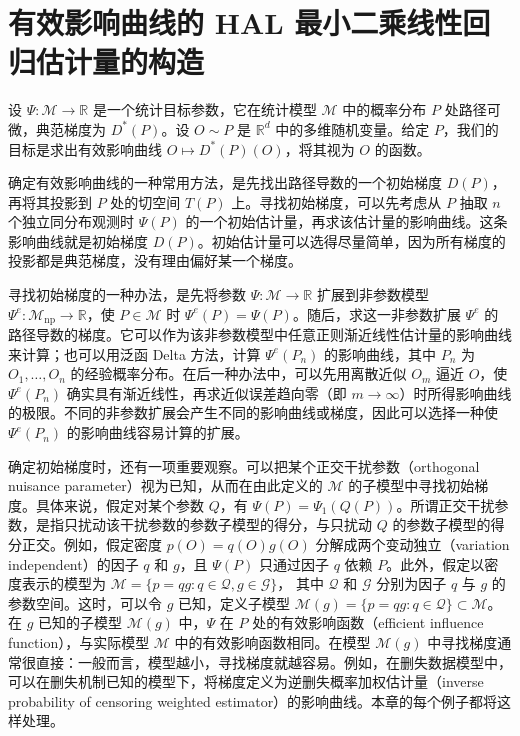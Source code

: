 \section{有效影响曲线的 HAL 最小二乘线性回归估计量的构造}

设 $\Psi:\mathcal M\to\mathbb R$ 是一个统计目标参数，它在统计模型 $\mathcal M$ 中的概率分布 $P$ 处路径可微，典范梯度为 $D^*(P)$。设 $O\sim P$ 是 $\mathbb R^d$ 中的多维随机变量。给定 $P$，我们的目标是求出有效影响曲线 $O\mapsto D^*(P)(O)$，将其视为 $O$ 的函数。

确定有效影响曲线的一种常用方法，是先找出路径导数的一个初始梯度 $D(P)$，再将其投影到 $P$ 处的切空间 $T(P)$ 上。寻找初始梯度，可以先考虑从 $P$ 抽取 $n$ 个独立同分布观测时 $\Psi(P)$ 的一个初始估计量，再求该估计量的影响曲线。这条影响曲线就是初始梯度 $D(P)$。初始估计量可以选得尽量简单，因为所有梯度的投影都是典范梯度，没有理由偏好某一个梯度。

寻找初始梯度的一种办法，是先将参数 $\Psi:\mathcal M\to\mathbb R$ 扩展到非参数模型 $\Psi^e:\mathcal M_{\mathrm{np}}\to\mathbb R$，使 $P\in\mathcal M$ 时 $\Psi^e(P)=\Psi(P)$。随后，求这一非参数扩展 $\Psi^e$ 的路径导数的梯度。它可以作为该非参数模型中任意正则渐近线性估计量的影响曲线来计算；也可以用泛函 Delta 方法，计算 $\Psi^e(P_n)$ 的影响曲线，其中 $P_n$ 为 $O_1,\ldots,O_n$ 的经验概率分布。在后一种办法中，可以先用离散近似 $O_m$ 逼近 $O$，使 $\Psi^e(P_n)$ 确实具有渐近线性，再求近似误差趋向零（即 $m\to\infty$）时所得影响曲线的极限。不同的非参数扩展会产生不同的影响曲线或梯度，因此可以选择一种使 $\Psi^e(P_n)$ 的影响曲线容易计算的扩展。

确定初始梯度时，还有一项重要观察。可以把某个正交干扰参数（orthogonal nuisance parameter）视为已知，从而在由此定义的 $\mathcal M$ 的子模型中寻找初始梯度。具体来说，假定对某个参数 $Q$，有 $\Psi(P)=\Psi_1(Q(P))$。所谓正交干扰参数，是指只扰动该干扰参数的参数子模型的得分，与只扰动 $Q$ 的参数子模型的得分正交。例如，假定密度 $p(O)=q(O)g(O)$ 分解成两个变动独立（variation independent）的因子 $q$ 和 $g$，且 $\Psi(P)$ 只通过因子 $q$ 依赖 $P$。此外，假定以密度表示的模型为
$\mathcal M=\{p=qg:q\in\mathcal Q,g\in\mathcal G\}$，
其中 $\mathcal Q$ 和 $\mathcal G$ 分别为因子 $q$ 与 $g$ 的参数空间。这时，可以令 $g$ 已知，定义子模型
$\mathcal M(g)=\{p=qg:q\in\mathcal Q\}\subset\mathcal M$。
在 $g$ 已知的子模型 $\mathcal M(g)$ 中，$\Psi$ 在 $P$ 处的有效影响函数（efficient influence function），与实际模型 $\mathcal M$ 中的有效影响函数相同。在模型 $\mathcal M(g)$ 中寻找梯度通常很直接：一般而言，模型越小，寻找梯度就越容易。例如，在删失数据模型中，可以在删失机制已知的模型下，将梯度定义为逆删失概率加权估计量（inverse probability of censoring weighted estimator）的影响曲线。本章的每个例子都将这样处理。

